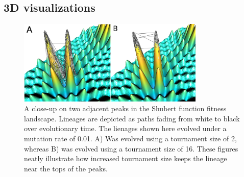 \documentclass[letterpaper]{article}
\begin{document}
\subsection{3D visualizations}

\begin{figure}
\includegraphics[width=3.5in]{figs/shubert_landscape.png}
\caption{\small A close-up on two adjacent peaks in the Shubert function fitness landscape. Lineages are depicted as paths fading from white to black over evolutionary time. The lienages shown here evolved under a mutation rate of 0.01. A) Was evolved using a tournament size of 2, whereas B) was evolved using a tournament size of 16. These figures neatly illustrate how increased tournament size keeps the lineage near the tops of the peaks.}
\label{fig:lineageviz}
\end{figure}



\end{document}
